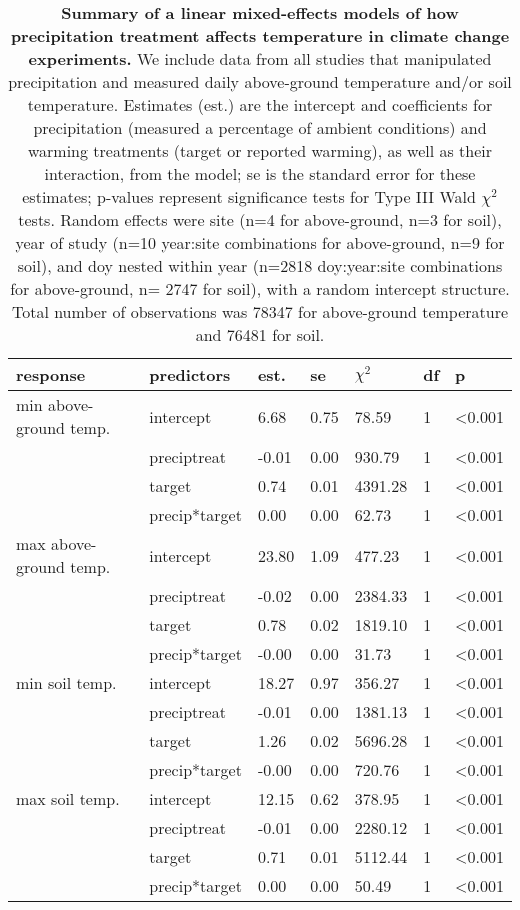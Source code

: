\documentclass{article}
\begin{document}
\begin{table}[ht]
\centering
\caption{\textbf{Summary of a linear mixed-effects models of how precipitation treatment affects temperature in climate change experiments.} We include data from all studies that manipulated precipitation and measured daily above-ground temperature and/or soil temperature. Estimates (est.) are the intercept and coefficients for precipitation (measured a percentage of ambient conditions) and warming treatments (target or reported warming), as well as their interaction, from the model; se is the standard error for these estimates; p-values represent significance tests for Type III Wald $\chi^{2}$ tests. Random effects were site (n=4 for above-ground, n=3 for soil), year of study (n=10 year:site combinations for above-ground, n=9 for soil), and doy nested within year (n=2818 doy:year:site combinations for above-ground, n= 2747 for soil), with a random intercept structure. Total number of observations was 78347 for above-ground temperature and 76481 for soil.} 
\label{table:preciptemp}
\begingroup\footnotesize
\begin{tabular}{|p{}|p{}|p{}|p{}|p{}|p{}|p{}|}
  \hline
response & predictors & est. & se & $\chi^{2}$ & df & p \\ 
  \hline
min above-ground temp. & intercept & 6.68 & 0.75 & 78.59 & 1 & <0.001 \\ 
   & preciptreat & -0.01 & 0.00 & 930.79 & 1 & <0.001 \\ 
   & target & 0.74 & 0.01 & 4391.28 & 1 & <0.001 \\ 
   & precip*target & 0.00 & 0.00 & 62.73 & 1 & <0.001 \\ 
   \hline
max above-ground temp. & intercept & 23.80 & 1.09 & 477.23 & 1 & <0.001 \\ 
   & preciptreat & -0.02 & 0.00 & 2384.33 & 1 & <0.001 \\ 
   & target & 0.78 & 0.02 & 1819.10 & 1 & <0.001 \\ 
   & precip*target & -0.00 & 0.00 & 31.73 & 1 & <0.001 \\ 
   \hline
min soil temp. & intercept & 18.27 & 0.97 & 356.27 & 1 & <0.001 \\ 
   & preciptreat & -0.01 & 0.00 & 1381.13 & 1 & <0.001 \\ 
   & target & 1.26 & 0.02 & 5696.28 & 1 & <0.001 \\ 
   & precip*target & -0.00 & 0.00 & 720.76 & 1 & <0.001 \\ 
   \hline
max soil temp. & intercept & 12.15 & 0.62 & 378.95 & 1 & <0.001 \\ 
   & preciptreat & -0.01 & 0.00 & 2280.12 & 1 & <0.001 \\ 
   & target & 0.71 & 0.01 & 5112.44 & 1 & <0.001 \\ 
   & precip*target & 0.00 & 0.00 & 50.49 & 1 & <0.001 \\ 
   \hline
\end{tabular}
\endgroup
\end{table}  %
\end{document}
